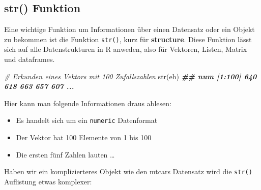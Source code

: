 \documentclass[
]{article}
\newenvironment{Shaded}{\begin{snugshade}}{\end{snugshade}}
\newcommand{\CommentTok}[1]{\textcolor[rgb]{0.56,0.35,0.01}{\textit{#1}}}
\newcommand{\DocumentationTok}[1]{\textcolor[rgb]{0.56,0.35,0.01}{\textbf{\textit{#1}}}}
\newcommand{\FunctionTok}[1]{\textcolor[rgb]{0.00,0.00,0.00}{#1}}
\newcommand{\NormalTok}[1]{#1}
\providecommand{\tightlist}{%
  \setlength{\itemsep}{0pt}\setlength{\parskip}{0pt}}
\begin{document}
\hypertarget{str-funktion}{%
\subsection{str() Funktion}\label{str-funktion}}

Eine wichtige Funktion um Informationen über einen Datensatz oder ein Objekt zu bekommen ist die Funktion \texttt{str()}, kurz für \textbf{structure}. Diese Funktion lässt sich auf alle Datenstrukturen in R anweden, also für Vektoren, Listen, Matrix und dataframes.

\begin{Shaded}
\begin{Highlighting}[]
\CommentTok{\# Erkunden eines Vektors mit 100 Zufallszahlen}
\FunctionTok{str}\NormalTok{(eh)}
\DocumentationTok{\#\#  num [1:100] 640 618 663 657 607 ...}
\end{Highlighting}
\end{Shaded}

Hier kann man folgende Informationen draus ablesen:

\begin{itemize}
\tightlist
\item
  Es handelt sich um ein \texttt{numeric} Datenformat
\item
  Der Vektor hat 100 Elemente von 1 bis 100
\item
  Die ersten fünf Zahlen lauten \ldots{}
\end{itemize}

Haben wir ein komplizierteres Objekt wie den mtcars Datensatz wird die \texttt{str()} Auflistung etwas komplexer:

\begin{Shaded}
\end{Shaded}
\end{document}
